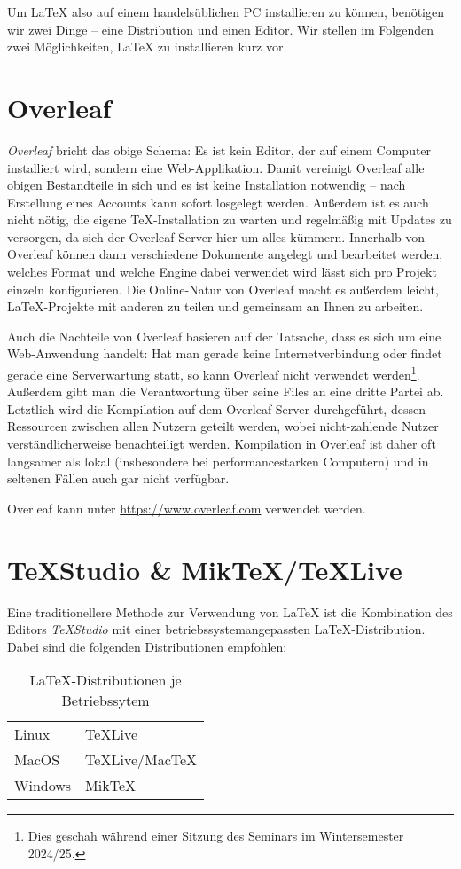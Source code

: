 Um \LaTeX{} also auf einem handelsüblichen PC installieren zu können, benötigen wir zwei Dinge -- eine Distribution und einen Editor.
Wir stellen im Folgenden zwei Möglichkeiten, \LaTeX{} zu installieren kurz vor.

\section{Overleaf}
\emph{Overleaf} bricht das obige Schema: Es ist kein Editor, der auf einem Computer installiert wird, sondern eine Web-Applikation.
Damit vereinigt Overleaf alle obigen Bestandteile in sich und es ist keine Installation notwendig -- nach Erstellung eines Accounts kann sofort losgelegt werden.
Außerdem ist es auch nicht nötig, die eigene \TeX{}-Installation zu warten und regelmäßig mit Updates zu versorgen, da sich der Overleaf-Server hier um alles kümmern.
Innerhalb von Overleaf können dann verschiedene Dokumente angelegt und bearbeitet werden, welches Format und welche Engine dabei verwendet wird lässt sich pro Projekt einzeln konfigurieren.
Die Online-Natur von Overleaf macht es außerdem leicht, \LaTeX{}-Projekte mit anderen zu teilen und gemeinsam an Ihnen zu arbeiten.

Auch die Nachteile von Overleaf basieren auf der Tatsache, dass es sich um eine Web-Anwendung handelt:
Hat man gerade keine Internetverbindung oder findet gerade eine Serverwartung statt, so kann Overleaf nicht verwendet werden\footnote{Dies geschah während einer Sitzung des Seminars im Wintersemester 2024/25.}.
Außerdem gibt man die Verantwortung über seine Files an eine dritte Partei ab.
Letztlich wird die Kompilation auf dem Overleaf-Server durchgeführt, dessen Ressourcen zwischen allen Nutzern geteilt werden, wobei nicht-zahlende Nutzer verständlicherweise benachteiligt werden.
Kompilation in Overleaf ist daher oft langsamer als lokal (insbesondere bei performancestarken Computern) und in seltenen Fällen auch gar nicht verfügbar.

Overleaf kann unter \url{https://www.overleaf.com} verwendet werden.

\section{TeXStudio \& MikTeX/TeXLive}
Eine traditionellere Methode zur Verwendung von \LaTeX{} ist die Kombination des Editors \emph{TeXStudio} mit einer betriebssystemangepassten \LaTeX{}-Distribution.
Dabei sind die folgenden Distributionen empfohlen:
\begin{table}[h]
	\begin{tabular}{l l}
		\toprule
		Linux & TeXLive \tabularnewline
		MacOS & TeXLive/MacTeX \tabularnewline
		Windows & MikTeX \tabularnewline
		\bottomrule
	\end{tabular}
	\caption{\LaTeX{}-Distributionen je Betriebssytem}
\end{table}

